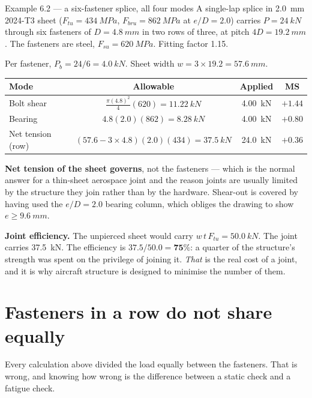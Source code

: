 \documentclass[11pt,a4paper]{article}
\begin{document}
\begin{examplebox}{Example 6.2 --- a six-fastener splice, all four modes}
A single-lap splice in \SI{2.0}{mm} 2024-T3 sheet ($F_{tu}=\SI{434}{MPa}$,
$F_{bru}=\SI{862}{MPa}$ at $e/D=2.0$) carries $P=\SI{24}{kN}$ through six fasteners of
$D=\SI{4.8}{mm}$ in two rows of three, at pitch $4D=\SI{19.2}{mm}$. The fasteners are steel,
$F_{su}=\SI{620}{MPa}$. Fitting factor 1.15.

\medskip
Per fastener, $P_b=24/6=\SI{4.0}{kN}$. Sheet width $w=3\times19.2=\SI{57.6}{mm}$.

\begin{center}\small
\begin{tabular}{@{}lccc@{}}
\toprule
Mode & Allowable & Applied & MS\\
\midrule
Bolt shear & $\frac{\pi(4.8)^2}{4}(620)=\SI{11.22}{kN}$ & \SI{4.00}{kN} & $+1.44$\\[3pt]
Bearing & $4.8(2.0)(862)=\SI{8.28}{kN}$ & \SI{4.00}{kN} & $+0.80$\\[3pt]
Net tension (row) & $(57.6-3\times4.8)(2.0)(434)=\SI{37.5}{kN}$ & \SI{24.0}{kN} & $\mathbf{+0.36}$\\
\bottomrule
\end{tabular}
\end{center}

\medskip
\textbf{Net tension of the sheet governs}, not the fasteners --- which is the normal answer for a
thin-sheet aerospace joint and the reason joints are usually limited by the structure they join
rather than by the hardware. Shear-out is covered by having used the $e/D=2.0$ bearing column,
which obliges the drawing to show $e\ge\SI{9.6}{mm}$.

\medskip
\textbf{Joint efficiency.} The unpierced sheet would carry $w\,t\,F_{tu}=\SI{50.0}{kN}$. The joint
carries \SI{37.5}{kN}. The efficiency is $37.5/50.0=\mathbf{75\%}$: a quarter of the structure's
strength was spent on the privilege of joining it. \emph{That} is the real cost of a joint, and it
is why aircraft structure is designed to minimise the number of them.
\end{examplebox}

\section{Fasteners in a row do not share equally}
\label{sec:row}

Every calculation above divided the load equally between the fasteners. That is wrong, and knowing
how wrong is the difference between a static check and a fatigue check.
\end{document}
